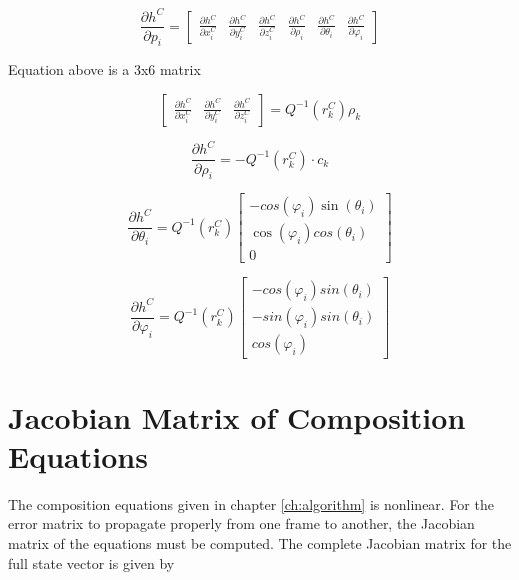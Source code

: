 \begin{equation}
\frac{\partial h^{C}}{\partial p_{i}}=\begin{bmatrix}
\frac{\partial h^{C}}{\partial x_{i}^{C}} & 
\frac{\partial h^{C}}{\partial y_{i}^{C}} & 
\frac{\partial h^{C}}{\partial z_{i}^{C}} & 
\frac{\partial h^{C}}{\partial \rho _{i}} &
\frac{\partial h^{C}}{\partial \theta _{i}} &
\frac{\partial h^{C}}{\partial \varphi _{i}}
\end{bmatrix}
\end{equation}

Equation above is a 3x6 matrix

\begin{equation}
\begin{bmatrix}
\frac{\partial h^{C}}{\partial x_{i}^{C}} & 
\frac{\partial h^{C}}{\partial y_{i}^{C}} & 
\frac{\partial h^{C}}{\partial z_{i}^{C}}
\end{bmatrix}
 =Q^{-1}(r_{k}^{C})\rho _{k}
\end{equation}


\begin{equation}
\frac{\partial h^{C}}{\partial \rho _{i}}=-Q^{-1}(r_{k}^{C})\cdot c_{k}
\end{equation}


\begin{equation}
\frac{\partial h^{C}}{\partial \theta _{i}}=
Q^{-1}(r_{k}^{C}) \begin{bmatrix}
-cos(\varphi _{i})\sin(\theta _{i}) \\
\cos (\varphi _{i})cos(\theta _{i}) \\
0 \end{bmatrix}
\end{equation}

\begin{equation}
\frac{\partial h^{C}}{\partial \varphi _{i}}= 
Q^{-1}(r_{k}^{C}) \begin{bmatrix}
-cos(\varphi _{i})sin(\theta _{i}) \\
-sin(\varphi _{i})sin(\theta _{i}) \\
cos(\varphi _{i})
\end{bmatrix}
\end{equation}

\section{Jacobian Matrix of Composition Equations}
\label{sec:jac_composition}

The composition equations given in chapter \ref{ch:algorithm} is
nonlinear. For the error matrix to propagate properly from one
frame to another, the Jacobian matrix of the equations must be
computed. The complete Jacobian matrix for the full state vector is
given by 

